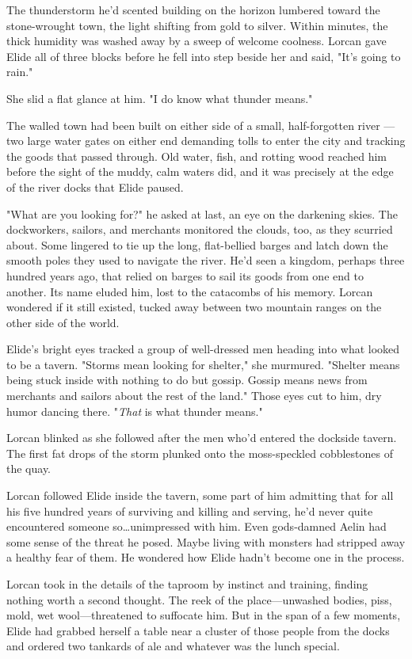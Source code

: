 The thunderstorm he'd scented building on the horizon lumbered toward the stone-wrought town, the light shifting from gold to silver.
Within minutes, the thick humidity was washed away by a sweep of welcome coolness.
Lorcan gave Elide all of three blocks before he fell into step beside her and said, "It's going to rain."

She slid a flat glance at him.
"I do know what thunder means."

The walled town had been built on either side of a small, half-forgotten river ---two large water gates on either end demanding tolls to enter the city and tracking the goods that passed through.
Old water, fish, and rotting wood reached him before the sight of the muddy, calm waters did, and it was precisely at the edge of the river docks that Elide paused.

"What are you looking for?"
he asked at last, an eye on the darkening skies.
The dockworkers, sailors, and merchants monitored the clouds, too, as they scurried about.
Some lingered to tie up the long, flat-bellied barges and latch down the smooth poles they used to navigate the river.
He'd seen a kingdom, perhaps three hundred years ago, that relied on barges to sail its goods from one end to another.
Its name eluded him, lost to the catacombs of his memory.
Lorcan wondered if it still existed, tucked away between two mountain ranges on the other side of the world.

Elide's bright eyes tracked a group of well-dressed men heading into what looked to be a tavern.
"Storms mean looking for shelter," she murmured.
"Shelter means being stuck inside with nothing to do but gossip.
Gossip means news from merchants and sailors about the rest of the land."
Those eyes cut to him, dry humor dancing there.
"\emph{That} is what thunder means."

Lorcan blinked as she followed after the men who'd entered the dockside tavern.
The first fat drops of the storm plunked onto the moss-speckled cobblestones of the quay.

Lorcan followed Elide inside the tavern, some part of him admitting that for all his five hundred years of surviving and killing and serving, he'd never quite encountered someone so\ldots unimpressed with him.
Even gods-damned Aelin had some sense of the threat he posed.
Maybe living with monsters had stripped away a healthy fear of them.
He wondered how Elide hadn't become one in the process.

Lorcan took in the details of the taproom by instinct and training, finding nothing worth a second thought.
The reek of the place---unwashed bodies, piss, mold, wet wool---threatened to suffocate him.
But in the span of a few moments, Elide had grabbed herself a table near a cluster of those people from the docks and ordered two tankards of ale and whatever was the lunch special.

